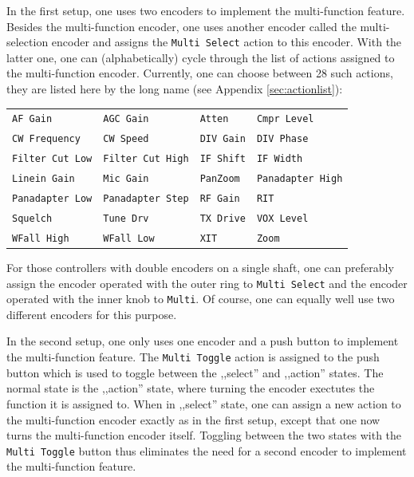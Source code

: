 \documentclass[12pt]{book}
\def\bltt#1{\texttt{\color{blue}#1}}
\begin{document}
In the first setup, one uses two encoders to implement the multi-function feature. Besides the multi-function
encoder, one uses another encoder called the multi-selection encoder and assigns
the \bltt{Multi Select} action to this encoder. With the latter one, one can 
(alphabetically) cycle
through the list of actions assigned to the multi-function encoder. Currently, one can choose between
28 such actions, they are listed here by the long name (see Appendix \ref{sec:actionlist}):

\begin{center}
\begin{tabular}{llll}
\bltt{AF Gain}         & \bltt{AGC Gain} & \bltt{Atten}       & \bltt{Cmpr Level}     \\
\bltt{CW Frequency} & \bltt{CW Speed}        & \bltt{DIV Gain} & \bltt{DIV Phase}  \\
\bltt{Filter Cut Low} & \bltt{Filter Cut High} & \bltt{IF Shift}        & \bltt{IF Width} \\
\bltt{Linein Gain} & \bltt{Mic Gain}       & \bltt{PanZoom} & \bltt{Panadapter High} \\
\bltt{Panadapter Low} & \bltt{Panadapter Step} & \bltt{RF Gain} & \bltt{RIT} \\
\bltt{Squelch} & \bltt{Tune Drv} & \bltt{TX Drive} & \bltt{VOX Level}  \\
\bltt{WFall High} & \bltt{WFall Low} & \bltt{XIT} & \bltt{Zoom}
\end{tabular}
\end{center}

For those controllers with double encoders on a single shaft, one can preferably assign the encoder
operated with the outer ring  to \bltt{Multi Select} and the encoder operated with the inner
knob to \bltt{Multi}. Of course, one can equally well use two different encoders for this purpose.

In the second setup, one only uses one encoder and a push button to implement the multi-function
feature. The \bltt{Multi Toggle} action is assigned to the push button which is used to toggle
between the ,,select'' and ,,action'' states. The normal state is the ,,action'' state, where
turning the encoder exectutes the function it is assigned to. When in ,,select'' state, one can
assign a new action to the multi-function encoder exactly as in the first setup, except that
one now turns the multi-function encoder itself. Toggling between the
two states with the \bltt{Multi Toggle} button
thus eliminates the need for a second encoder to implement the multi-function feature.
\end{document}
